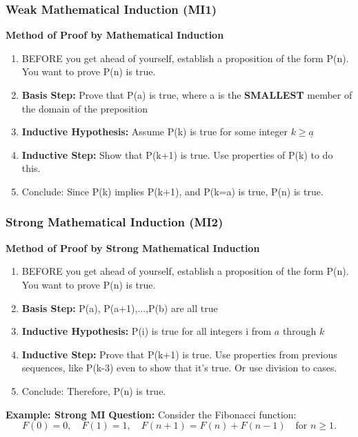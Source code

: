 \documentclass{article}
\newcommand{\sub}[1]{\vspace{10pt}\textbf{#1}}
\begin{document}
\subsubsection{Weak Mathematical Induction (MI1)}
\begin{center}
    \textbf{Method of Proof by Mathematical Induction}
\end{center}
\begin{enumerate}
    \item BEFORE you get ahead of yourself, establish a proposition of the form P(n). You want to prove P(n) is true.
    \item \textbf{Basis Step:} Prove that P(a) is true, where a is the \textbf{SMALLEST} member of the domain of the preposition
    \item \textbf{Inductive Hypothesis:} Assume P(k) is true for some integer $k\geq \underline{a}$
    \item \textbf{Inductive Step:} Show that P(k+1) is true. Use properties of P(k) to do this.
    \item Conclude: Since P(k) implies P(k+1), and P(k=a) is true, P(n) is true.
\end{enumerate}

\subsubsection{Strong Mathematical Induction (MI2)}
\begin{center}
    \textbf{Method of Proof by Strong Mathematical Induction}
\end{center}
\begin{enumerate}
    \item BEFORE you get ahead of yourself, establish a proposition of the form P(n). You want to prove P(n) is true.
    \item \textbf{Basis Step:} P(a), P(a+1),...,P(b) are all true
    \item \textbf{Inductive Hypothesis:} P(i) is true for all integers i from $a$ through $k$
    \item \textbf{Inductive Step:} Prove that P(k+1) is true. Use properties from previous sequences, like P(k-3) even to show that it's true. Or use division to cases.
    \item Conclude: Therefore, P(n) is true.
\end{enumerate}

\sub{Example: Strong MI}
\textbf{Question:} Consider the Fibonacci function:
\[
F(0) = 0, \quad F(1) = 1, \quad F(n+1) = F(n) + F(n-1) \quad \text{for } n \geq 1.
\]
\end{document}

